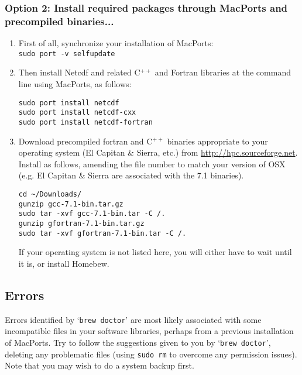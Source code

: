 \documentclass[11pt,fleqn]{book} %
\begin{document}
%
\subsubsection*{Option 2: Install required packages through MacPorts and precompiled binaries...}

\begin{enumerate}

\item First of all, synchronize your installation of MacPorts:
\\\texttt{sudo port -v selfupdate}

\item Then install Netcdf and related C\(^{++}\) and Fortran libraries at the command line using MacPorts, as follows:

\vspace{-5pt}\begin{verbatim}
sudo port install netcdf
sudo port install netcdf-cxx
sudo port install netcdf-fortran
\end{verbatim}

\item Download precompiled fortran and C\(^{++}\)  binaries appropriate to your operating system (El Capitan \& Sierra, etc.) from \href{http://hpc.sourceforge.net}{http://hpc.sourceforge.net}. Install as follows, amending the file number to match your version of OSX (e.g. El Capitan \& Sierra are associated with the 7.1 binaries).

\vspace{-5pt}\begin{verbatim}
cd ~/Downloads/
gunzip gcc-7.1-bin.tar.gz
sudo tar -xvf gcc-7.1-bin.tar -C /.
gunzip gfortran-7.1-bin.tar.gz
sudo tar -xvf gfortran-7.1-bin.tar -C /.
\end{verbatim}

If your operating system is not listed here, you will either have to wait until it is, or install Homebew.

\end{enumerate}

%
\subsection*{Errors}\label{how-to-macports-errors}

Errors identified by `\texttt{brew doctor}' are most likely associated with some incompatible files in your software libraries, perhaps from a previous installation of MacPorts. Try to follow the suggestions given to you by `\texttt{brew doctor}', deleting any problematic files (using \texttt{sudo rm} to overcome any permission issues). Note that you may wish to do a system backup first.
\end{document}
